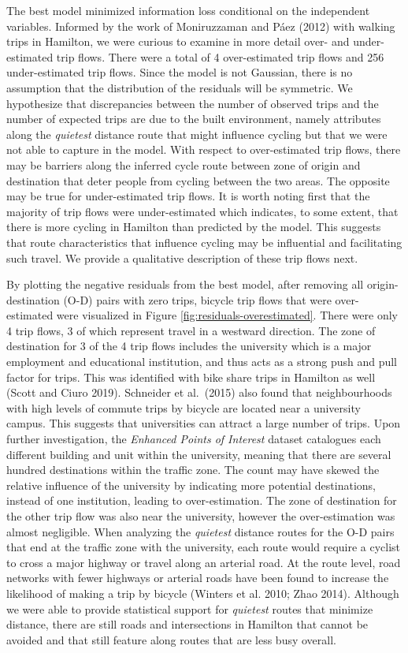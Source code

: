 \documentclass[smallextended]{svjour3}       %
\begin{document}
The best model minimized information loss conditional on the independent
variables. Informed by the work of Moniruzzaman and Páez (2012) with
walking trips in Hamilton, we were curious to examine in more detail
over- and under-estimated trip flows. There were a total of 4
over-estimated trip flows and 256 under-estimated trip flows. Since the
model is not Gaussian, there is no assumption that the distribution of
the residuals will be symmetric. We hypothesize that discrepancies
between the number of observed trips and the number of expected trips
are due to the built environment, namely attributes along the
\emph{quietest} distance route that might influence cycling but that we
were not able to capture in the model. With respect to over-estimated
trip flows, there may be barriers along the inferred cycle route between
zone of origin and destination that deter people from cycling between
the two areas. The opposite may be true for under-estimated trip flows.
It is worth noting first that the majority of trip flows were
under-estimated which indicates, to some extent, that there is more
cycling in Hamilton than predicted by the model. This suggests that
route characteristics that influence cycling may be influential and
facilitating such travel. We provide a qualitative description of these
trip flows next.

By plotting the negative residuals from the best model, after removing
all origin-destination (O-D) pairs with zero trips, bicycle trip flows
that were over-estimated were visualized in Figure
\ref{fig:residuals-overestimated}. There were only 4 trip flows, 3 of
which represent travel in a westward direction. The zone of destination
for 3 of the 4 trip flows includes the university which is a major
employment and educational institution, and thus acts as a strong push
and pull factor for trips. This was identified with bike share trips in
Hamilton as well (Scott and Ciuro 2019). Schneider et al.~(2015) also
found that neighbourhoods with high levels of commute trips by bicycle
are located near a university campus. This suggests that universities
can attract a large number of trips. Upon further investigation, the
\emph{Enhanced Points of Interest} dataset catalogues each different
building and unit within the university, meaning that there are several
hundred destinations within the traffic zone. The count may have skewed
the relative influence of the university by indicating more potential
destinations, instead of one institution, leading to over-estimation.
The zone of destination for the other trip flow was also near the
university, however the over-estimation was almost negligible. When
analyzing the \emph{quietest} distance routes for the O-D pairs that end
at the traffic zone with the university, each route would require a
cyclist to cross a major highway or travel along an arterial road. At
the route level, road networks with fewer highways or arterial roads
have been found to increase the likelihood of making a trip by bicycle
(Winters et al. 2010; Zhao 2014). Although we were able to provide
statistical support for \emph{quietest} routes that minimize distance,
there are still roads and intersections in Hamilton that cannot be
avoided and that still feature along routes that are less busy overall.
\end{document}
